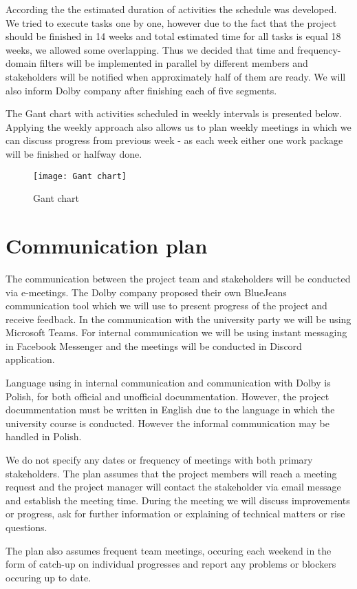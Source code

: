 \documentclass[12pt]{article}
\begin{document}
	According the the estimated duration of activities the schedule was developed. We tried to execute tasks one by one, however due to the fact that the project should be finished in 14 weeks and total estimated time for all tasks is equal 18 weeks, we allowed some overlapping. Thus we decided that time and frequency-domain filters will be implemented in parallel by different members and stakeholders will be notified when approximately half of them are ready. We will also inform Dolby company after finishing each of five segments.
	
	The Gant chart with activities scheduled in weekly intervals is presented below. Applying the weekly approach also allows us to plan weekly meetings in which we can discuss progress from previous week - as each week either one work package will be finished or halfway done.

\begin{figure}[H]
		\texttt{[image: Gant chart]}
		\caption{Gant chart}
	\end{figure}

\section{Communication plan}
	
	The communication between the project team and stakeholders will be conducted via e-meetings. The Dolby company proposed their own BlueJeans communication tool which we will use to present progress of the project and receive feedback. In the communication with the university party we will be using Microsoft Teams. For internal communication we will be using instant messaging in Facebook Messenger and the meetings will be conducted in Discord application.
	
	Language using in internal communication and communication with Dolby is Polish, for both official and unofficial docummentation. However, the project docummentation must be written in English due to the language in which the university course is conducted. However the informal communication may be handled in Polish.
	
	We do not specify any dates or frequency of meetings with both primary stakeholders. The plan assumes that the project members will reach a meeting request and the project manager will contact the stakeholder via email message and establish the meeting time. During the meeting we will discuss improvements or progress, ask for further information or explaining of technical matters or rise questions.
	
	The plan also assumes frequent team meetings, occuring each weekend in the form of catch-up on individual progresses and report any problems or blockers occuring up to date.
	
\end{document}
